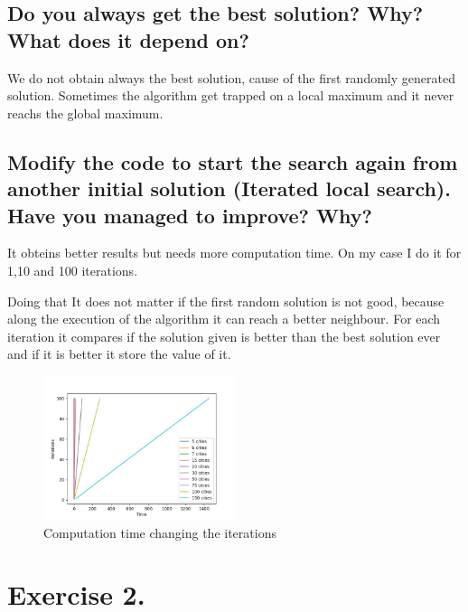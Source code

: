 \documentclass{article}
\begin{document}
    \subsection{Do you always get the best solution? Why? What does it depend on?}

        We do not obtain always the best solution, cause of the first randomly generated solution.
        Sometimes the algorithm get trapped on a local maximum and it never reachs the global maximum.


    \subsection{Modify the code to start the search again from another initial solution (Iterated local search). Have you managed to improve? Why?}
        
        It obteins better results but needs more computation time.
        On my case I do it for 1,10 and 100 iterations.

        Doing that It does not matter if the first random solution is not good, because along the execution of the algorithm it can reach a better neighbour.
        For each iteration it compares if the solution given is better than the best solution ever and if it is better it store the value of it.

        \begin{figure}[H]

            \centering
            \includegraphics[width=0.5\textwidth]{../media/03.TSP-iterative.png}
            \caption{Computation time changing the iterations}
            \label{Computation time changing the iterations}

        \end{figure}

    \newpage

    \section{Exercise 2.}
\end{document}

